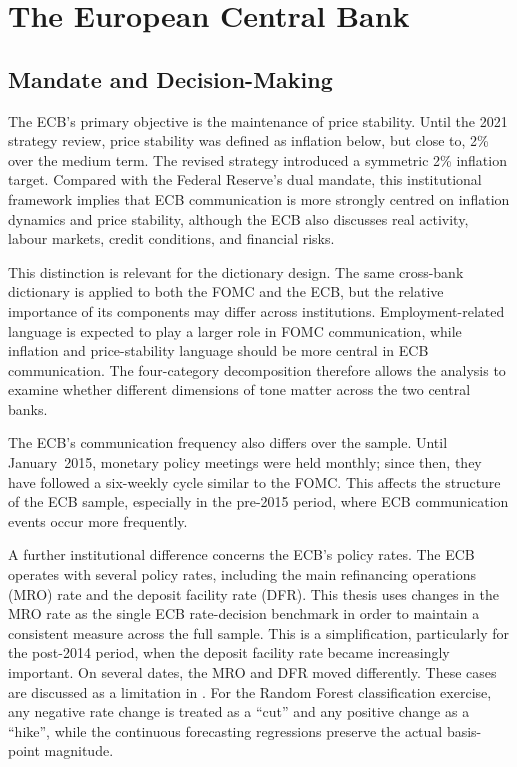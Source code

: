 \section{The European Central Bank}
\label{sec:inst_ecb}

\subsection{Mandate and Decision-Making}
\label{sec:inst_ecb_mandate}

The ECB's primary objective is the maintenance of price stability. Until
the 2021 strategy review, price stability was defined as inflation below,
but close to, 2\% over the medium term. The revised strategy introduced
a symmetric 2\% inflation target. Compared with the Federal Reserve's
dual mandate, this institutional framework implies that ECB
communication is more strongly centred on inflation dynamics and price
stability, although the ECB also discusses real activity, labour markets,
credit conditions, and financial risks.

This distinction is relevant for the dictionary design. The same
cross-bank dictionary is applied to both the FOMC and the ECB, but the
relative importance of its components may differ across institutions.
Employment-related language is expected to play a larger role in FOMC
communication, while inflation and price-stability language should be
more central in ECB communication. The four-category decomposition
therefore allows the analysis to examine whether different dimensions of
tone matter across the two central banks.

The ECB's communication frequency also differs over the sample. Until
January~2015, monetary policy meetings were held monthly; since then,
they have followed a six-weekly cycle similar to the FOMC. This affects
the structure of the ECB sample, especially in the pre-2015 period, where
ECB communication events occur more frequently.

A further institutional difference concerns the ECB's policy rates. The
ECB operates with several policy rates, including the main refinancing
operations (MRO) rate and the deposit facility rate (DFR). This thesis
uses changes in the MRO rate as the single ECB rate-decision benchmark
in order to maintain a consistent measure across the full sample. This is
a simplification, particularly for the post-2014 period, when the deposit
facility rate became increasingly important. On several dates, the MRO
and DFR moved differently. These cases are discussed as a limitation in
. For the Random Forest classification exercise, any
negative rate change is treated as a ``cut'' and any positive change as a
``hike'', while the continuous forecasting regressions preserve the
actual basis-point magnitude.


